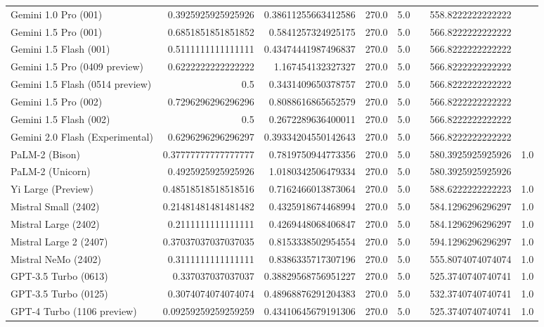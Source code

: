 \begin{table}[htp]
{\begin{tabular}{lrrrrrrr}
Gemini 1.0 Pro (001) & 0.3925925925925926 & 0.38611255663412586 & 270.0 & 5.0 &  & 558.8222222222222 &  \\
Gemini 1.5 Pro (001) & 0.6851851851851852 & 0.5841257324925175 & 270.0 & 5.0 &  & 566.8222222222222 &  \\
Gemini 1.5 Flash (001) & 0.5111111111111111 & 0.43474441987496837 & 270.0 & 5.0 &  & 566.8222222222222 &  \\
Gemini 1.5 Pro (0409 preview) & 0.6222222222222222 & 1.167454132327327 & 270.0 & 5.0 &  & 566.8222222222222 &  \\
Gemini 1.5 Flash (0514 preview) & 0.5 & 0.3431409650378757 & 270.0 & 5.0 &  & 566.8222222222222 &  \\
Gemini 1.5 Pro (002) & 0.7296296296296296 & 0.8088616865652579 & 270.0 & 5.0 &  & 566.8222222222222 &  \\
Gemini 1.5 Flash (002) & 0.5 & 0.2672289636400011 & 270.0 & 5.0 &  & 566.8222222222222 &  \\
Gemini 2.0 Flash (Experimental) & 0.6296296296296297 & 0.39334204550142643 & 270.0 & 5.0 &  & 566.8222222222222 &  \\
PaLM-2 (Bison) & 0.37777777777777777 & 0.7819750944773356 & 270.0 & 5.0 &  & 580.3925925925926 & 1.0 \\
PaLM-2 (Unicorn) & 0.4925925925925926 & 1.0180342506479334 & 270.0 & 5.0 &  & 580.3925925925926 &  \\
Yi Large (Preview) & 0.48518518518518516 & 0.7162466013873064 & 270.0 & 5.0 &  & 588.6222222222223 & 1.0 \\
Mistral Small (2402) & 0.21481481481481482 & 0.4325918674468994 & 270.0 & 5.0 &  & 584.1296296296297 & 1.0 \\
Mistral Large (2402) & 0.2111111111111111 & 0.4269448068406847 & 270.0 & 5.0 &  & 584.1296296296297 & 1.0 \\
Mistral Large 2 (2407) & 0.37037037037037035 & 0.8153338502954554 & 270.0 & 5.0 &  & 594.1296296296297 & 1.0 \\
Mistral NeMo (2402) & 0.3111111111111111 & 0.8386335717307196 & 270.0 & 5.0 &  & 555.8074074074074 & 1.0 \\
GPT-3.5 Turbo (0613) & 0.337037037037037 & 0.38829568756951227 & 270.0 & 5.0 &  & 525.3740740740741 & 1.0 \\
GPT-3.5 Turbo (0125) & 0.3074074074074074 & 0.48968876291204383 & 270.0 & 5.0 &  & 532.3740740740741 & 1.0 \\
GPT-4 Turbo (1106 preview) & 0.09259259259259259 & 0.43410645679191306 & 270.0 & 5.0 &  & 525.3740740740741 & 1.0 \\

\end{tabular}}
\end{table}
